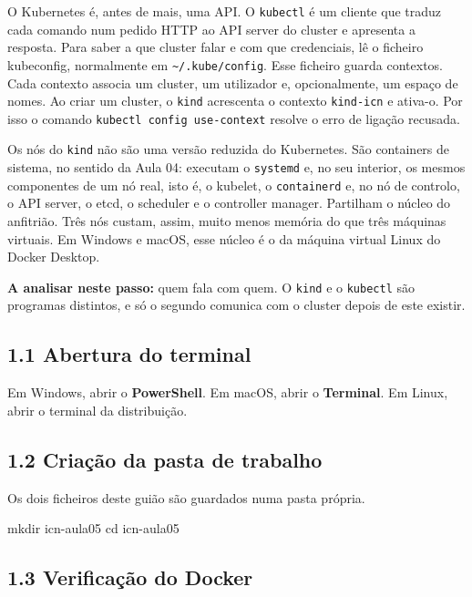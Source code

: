 \documentclass[11pt,a4paper]{article}
\newcommand{\cmd}[1]{\texttt{#1}}
\begin{document}
\begin{teoria}
O Kubernetes é, antes de mais, uma API. O \cmd{kubectl} é um cliente que traduz cada comando num pedido HTTP ao API server do cluster e apresenta a resposta. Para saber a que cluster falar e com que credenciais, lê o ficheiro kubeconfig, normalmente em \cmd{\textasciitilde/.kube/config}. Esse ficheiro guarda contextos. Cada contexto associa um cluster, um utilizador e, opcionalmente, um espaço de nomes. Ao criar um cluster, o \cmd{kind} acrescenta o contexto \cmd{kind-icn} e ativa-o. Por isso o comando \cmd{kubectl config use-context} resolve o erro de ligação recusada.

Os nós do \cmd{kind} não são uma versão reduzida do Kubernetes. São containers de sistema, no sentido da Aula 04: executam o \cmd{systemd} e, no seu interior, os mesmos componentes de um nó real, isto é, o kubelet, o \cmd{containerd} e, no nó de controlo, o API server, o etcd, o scheduler e o controller manager. Partilham o núcleo do anfitrião. Três nós custam, assim, muito menos memória do que três máquinas virtuais. Em Windows e macOS, esse núcleo é o da máquina virtual Linux do Docker Desktop.

\textbf{A analisar neste passo:} quem fala com quem. O \cmd{kind} e o \cmd{kubectl} são programas distintos, e só o segundo comunica com o cluster depois de este existir.
\end{teoria}

\subsection*{1.1 Abertura do terminal}

Em Windows, abrir o \textbf{PowerShell}. Em macOS, abrir o \textbf{Terminal}. Em Linux, abrir o terminal da distribuição.

\subsection*{1.2 Criação da pasta de trabalho}

Os dois ficheiros deste guião são guardados numa pasta própria.

\begin{terminal}
mkdir icn-aula05
cd icn-aula05
\end{terminal}

\subsection*{1.3 Verificação do Docker}
\end{document}
